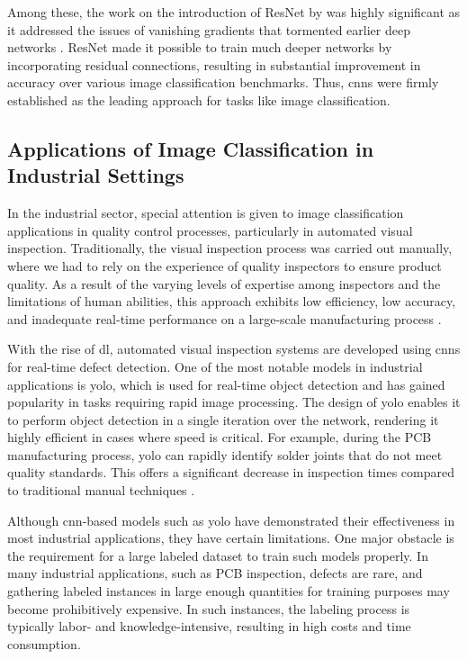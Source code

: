 Among these, the work on the introduction of ResNet by \cite{he2016deep} was highly significant as it addressed the issues of vanishing gradients that tormented earlier deep networks \cite{simonyan2015deepconvolutionalnetworkslargescale} \cite{7298594}. ResNet made it possible to train much deeper networks by incorporating residual connections, resulting in substantial improvement in accuracy over various image classification benchmarks. Thus, \glspl{cnn} were firmly established as the leading approach for tasks like image classification.

\subsection{Applications of Image Classification in Industrial Settings}

In the industrial sector, special attention is given to image classification applications in quality control processes, particularly in automated visual inspection. Traditionally, the visual inspection process was carried out manually, where we had to rely on the experience of quality inspectors to ensure product quality. As a result of the varying levels of expertise among inspectors and the limitations of human abilities, this approach exhibits low efficiency, low accuracy, and inadequate real-time performance on a large-scale manufacturing process \cite{Gong_2020}.

With the rise of \gls{dl}, automated visual inspection systems are developed using \glspl{cnn} for real-time defect detection. One of the most notable models in industrial applications is \gls{yolo}, which is used for real-time object detection and has gained popularity in tasks requiring rapid image processing. The design of \gls{yolo} enables it to perform object detection in a single iteration over the network, rendering it highly efficient in cases where speed is critical. For example, during the PCB manufacturing process, \gls{yolo} can rapidly identify solder joints that do not meet quality standards. This offers a significant decrease in inspection times compared to traditional manual techniques \cite{redmon2016you}.

Although \gls{cnn}-based models such as \gls{yolo} have demonstrated their effectiveness in most industrial applications, they have certain limitations. One major obstacle is the requirement for a large labeled dataset to train such models properly. In many industrial applications, such as PCB inspection, defects are rare, and gathering labeled instances in large enough quantities for training purposes may become prohibitively expensive. In such instances, the labeling process is typically labor- and knowledge-intensive, resulting in high costs and time consumption\cite{FINK2020103678}.

